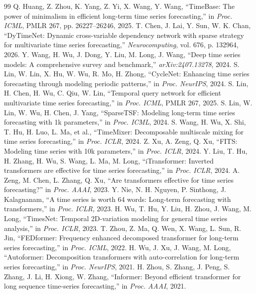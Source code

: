 \documentclass[12pt,a4paper]{report}
\numberwithin{equation}{chapter}
\begin{document}
\begin{thebibliography}{99}
 Q. Huang, Z. Zhou, K. Yang, Z. Yi, X. Wang, Y. Wang, ``TimeBase: The power of minimalism in efficient
  long-term time series forecasting,'' in \emph{Proc. ICML}, PMLR 267, pp. 26227--26246, 2025.
 T. Chen, J. Lai, Y. Sun, W. K. Chan, ``DyTimeNet: Dynamic cross-variable dependency network with sparse
  strategy for multivariate time series forecasting,'' \emph{Neurocomputing}, vol. 676, p. 132964, 2026.
 Y. Wang, H. Wu, J. Dong, Y. Liu, M. Long, J. Wang, ``Deep time series models: A comprehensive survey and
  benchmark,'' \emph{arXiv:2407.13278}, 2024.
 S. Lin, W. Lin, X. Hu, W. Wu, R. Mo, H. Zhong, ``CycleNet: Enhancing time series forecasting through
  modeling periodic patterns,'' in \emph{Proc. NeurIPS}, 2024.
 S. Lin, H. Chen, H. Wu, C. Qiu, W. Lin, ``Temporal query network for efficient multivariate time series
  forecasting,'' in \emph{Proc. ICML}, PMLR 267, 2025.
 S. Lin, W. Lin, W. Wu, H. Chen, J. Yang, ``SparseTSF: Modeling long-term time series forecasting with
  1k parameters,'' in \emph{Proc. ICML}, 2024.
 S. Wang, H. Wu, X. Shi, T. Hu, H. Luo, L. Ma, et al., ``TimeMixer: Decomposable multiscale mixing for
  time series forecasting,'' in \emph{Proc. ICLR}, 2024.
 Z. Xu, A. Zeng, Q. Xu, ``FITS: Modeling time series with 10k parameters,'' in \emph{Proc. ICLR}, 2024.
 Y. Liu, T. Hu, H. Zhang, H. Wu, S. Wang, L. Ma, M. Long, ``iTransformer: Inverted transformers are
  effective for time series forecasting,'' in \emph{Proc. ICLR}, 2024.
 A. Zeng, M. Chen, L. Zhang, Q. Xu, ``Are transformers effective for time series forecasting?'' in
  \emph{Proc. AAAI}, 2023.
 Y. Nie, N. H. Nguyen, P. Sinthong, J. Kalagnanam, ``A time series is worth 64 words: Long-term
  forecasting with transformers,'' in \emph{Proc. ICLR}, 2023.
 H. Wu, T. Hu, Y. Liu, H. Zhou, J. Wang, M. Long, ``TimesNet: Temporal 2D-variation modeling for general
  time series analysis,'' in \emph{Proc. ICLR}, 2023.
 T. Zhou, Z. Ma, Q. Wen, X. Wang, L. Sun, R. Jin, ``FEDformer: Frequency enhanced decomposed transformer
  for long-term series forecasting,'' in \emph{Proc. ICML}, 2022.
 H. Wu, J. Xu, J. Wang, M. Long, ``Autoformer: Decomposition transformers with auto-correlation for
  long-term series forecasting,'' in \emph{Proc. NeurIPS}, 2021.
 H. Zhou, S. Zhang, J. Peng, S. Zhang, J. Li, H. Xiong, W. Zhang, ``Informer: Beyond efficient
  transformer for long sequence time-series forecasting,'' in \emph{Proc. AAAI}, 2021.
\end{thebibliography}
\end{document}
